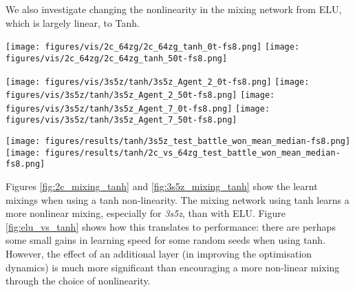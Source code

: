 \documentclass[twoside,11pt]{article}
\begin{document}
We also investigate changing the nonlinearity in the mixing network from ELU, which is largely linear, to Tanh.

\begin{figure*}[h!]
    \centering
    \texttt{[image: figures/vis/2c\_64zg/2c\_64zg\_tanh\_0t-fs8.png]}
    \texttt{[image: figures/vis/2c\_64zg/2c\_64zg\_tanh\_50t-fs8.png]}
    \caption{The learnt mixing of QMIX on \textit{2c\_vs\_64zg} using a tanh nonlinearity at the end of training for timesteps 0 (left) and 50 (right).}
    \label{fig:2c_mixing_tanh}
\end{figure*}

\begin{figure*}[h!]
    \centering
    \texttt{[image: figures/vis/3s5z/tanh/3s5z\_Agent\_2\_0t-fs8.png]}
    \texttt{[image: figures/vis/3s5z/tanh/3s5z\_Agent\_2\_50t-fs8.png]}
    \texttt{[image: figures/vis/3s5z/tanh/3s5z\_Agent\_7\_0t-fs8.png]}
    \texttt{[image: figures/vis/3s5z/tanh/3s5z\_Agent\_7\_50t-fs8.png]}
    \caption{The learnt mixing of QMIX on \textit{3s5z}, using a tanh nonlinearity, at the end of training for timesteps 0 (left) and 50 (right), for agents 2 (top) and 7 (bottom).
    }
    \label{fig:3s5z_mixing_tanh}
\end{figure*}

\begin{figure*}[h!]
    \centering
    \texttt{[image: figures/results/tanh/3s5z\_test\_battle\_won\_mean\_median-fs8.png]}
    \texttt{[image: figures/results/tanh/2c\_vs\_64zg\_test\_battle\_won\_mean\_median-fs8.png]}
    \caption{The Median test win \% comparing QMIX with an ELU nonlinearity (QMIX) and QMIX with a tanh nonlinearity in the mixing network (QMIX-Tanh).}
    \label{fig:elu_vs_tanh}
\end{figure*}

Figures \ref{fig:2c_mixing_tanh} and \ref{fig:3s5z_mixing_tanh} show the learnt mixings when using a tanh non-linearity.
The mixing network using tanh learns a more nonlinear mixing, especially for 
\textit{3s5z}, than with ELU.
Figure \ref{fig:elu_vs_tanh} shows how this translates to performance: there 
are perhaps some small gains in learning speed for some random seeds when using 
tanh.
However, the effect of an additional layer (in improving the optimisation 
dynamics) is much more significant than encouraging a more non-linear mixing 
through the choice of nonlinearity.
\end{document}
